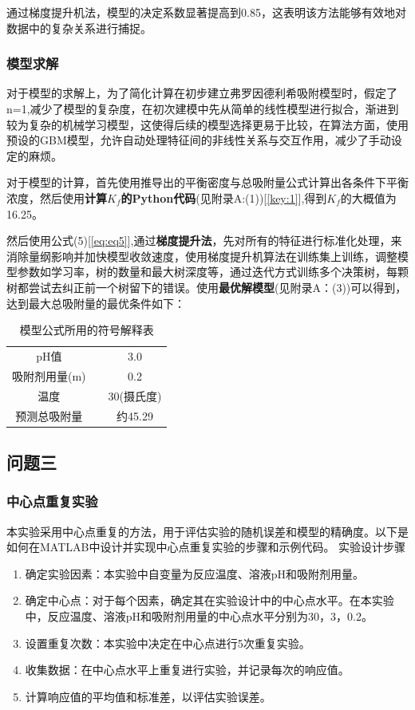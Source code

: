 \documentclass[AutoFakeBold]{ctexart}
\begin{document}
	
	通过梯度提升机法，模型的决定系数显著提高到0.85，这表明该方法能够有效地对数据中的复杂关系进行捕捉。
	
	\subsubsection{模型求解}
	对于模型的求解上，为了简化计算在初步建立弗罗因德利希吸附模型时，假定了n=1,减少了模型的复杂度，在初次建模中先从简单的线性模型进行拟合，渐进到较为复杂的机械学习模型，这使得后续的模型选择更易于比较，在算法方面，使用预设的GBM模型，允许自动处理特征间的非线性关系与交互作用，减少了手动设定的麻烦。
	
	对于模型的计算，首先使用推导出的平衡密度与总吸附量公式计算出各条件下平衡浓度，然后使用\textbf{计算$K_f$的Python代码}(见附录A:(1))[\ref{key:1}],得到$K_f$的大概值为16.25。
	
	然后使用公式(5)[\ref{eq:eq5}],通过\textbf{梯度提升法}，先对所有的特征进行标准化处理，来消除量纲影响并加快模型收敛速度，使用梯度提升机算法在训练集上训练，调整模型参数如学习率，树的数量和最大树深度等，通过迭代方式训练多个决策树，每颗树都尝试去纠正前一个树留下的错误。\cite{friedman2001greedy}使用\textbf{最优解模型}(见附录A：(3))\pageref{cite:3}可以得到，达到最大总吸附量的最优条件如下：
	
	\begin{table}[H]
		\centering
		\begin{tabular}{ccc}
			\toprule
			pH值 & &3.0 \\
			
		吸附剂用量(m) & & 0.2 \\
			温度 & & 30(摄氏度) \\
			预测总吸附量 & & 约45.29 \\
		
			\bottomrule
		\end{tabular}
		\caption{模型公式所用的符号解释表}
		\label{tab:example}
	\end{table}
	
	\subsection{问题三}
	\subsubsection{中心点重复实验}
	本实验采用中心点重复的方法，用于评估实验的随机误差和模型的精确度。以下是如何在MATLAB中设计并实现中心点重复实验的步骤和示例代码。
	实验设计步骤
	
	\begin{enumerate}
		\item 确定实验因素：本实验中自变量为反应温度、溶液pH和吸附剂用量。
		\item 确定中心点：对于每个因素，确定其在实验设计中的中心点水平。在本实验中，反应温度、溶液pH和吸附剂用量的中心点水平分别为30，3，0.2。
		\item 设置重复次数：本实验中决定在中心点进行5次重复实验。
		\item 收集数据：在中心点水平上重复进行实验，并记录每次的响应值。
		\item  计算响应值的平均值和标准差，以评估实验误差。
		
	\end{enumerate}
	
\end{document}
